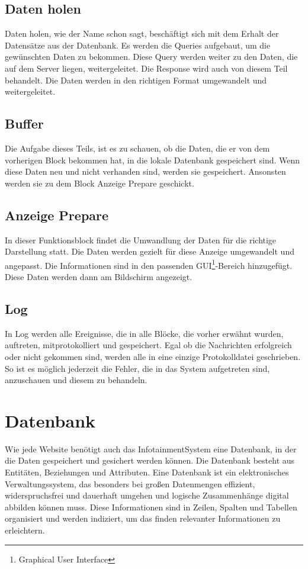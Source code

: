 \subsection{Daten holen}
Daten holen, wie der Name schon sagt, beschäftigt sich mit dem Erhalt der Datensätze aus der Datenbank. Es werden die Queries aufgebaut, um die gewünschten Daten zu bekommen. Diese Query werden weiter zu den Daten, die auf dem Server liegen, weitergeleitet. Die Response wird auch von diesem Teil behandelt. Die Daten werden in den richtigen Format umgewandelt und weitergeleitet.



\subsection{Buffer}
Die Aufgabe dieses Teils, ist es zu schauen, ob die Daten, die er von dem vorherigen Block bekommen hat, in die lokale Datenbank gespeichert sind. Wenn diese Daten neu und nicht verhanden sind, werden sie gespeichert. Ansonsten werden sie zu dem Block Anzeige Prepare geschickt.

\subsection{Anzeige Prepare}
In dieser Funktionsblock findet die Umwandlung der Daten für die richtige Darstellung statt. Die Daten werden gezielt für diese Anzeige umgewandelt und angepasst. Die Informationen sind in den passenden GUI\footnote{Graphical User Interface}-Bereich hinzugefügt. Diese Daten werden dann am Bildschirm angezeigt.

\subsection{Log}
In Log werden alle Ereignisse, die in alle Blöcke, die vorher erwähnt wurden, auftreten, mitprotokolliert und gespeichert.  Egal ob die Nachrichten erfolgreich oder nicht gekommen sind, werden alle in eine einzige Protokolldatei geschrieben. So ist es möglich jederzeit die Fehler, die in das System aufgetreten sind, anzuschauen und diesem zu behandeln.

\section{Datenbank}
Wie jede Website benötigt auch das InfotainmentSystem eine Datenbank, in der die Daten gespeichert und gesichert werden können. Die Datenbank besteht aus Entitäten, Beziehungen und Attributen. Eine Datenbank ist ein elektronisches Verwaltungssystem, das besonders bei großen Datenmengen effizient, widerspruchsfrei und dauerhaft umgehen und logische Zusammenhänge digital abbilden können muss. Diese Informationen sind in Zeilen, Spalten und Tabellen organisiert und werden indiziert, um das finden relevanter Informationen zu erleichtern.


